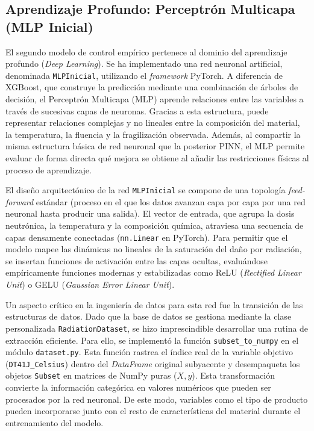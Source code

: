 \documentclass[a4paper, 12pt, twocolumn]{book}
\begin{document}
\subsection{Aprendizaje Profundo: Perceptrón Multicapa (MLP Inicial)}

El segundo modelo de control empírico pertenece al dominio del aprendizaje profundo (\textit{Deep Learning}). Se ha implementado una red neuronal artificial, denominada \texttt{MLPInicial}, utilizando el \textit{framework} PyTorch. A diferencia de XGBoost, que construye la predicción mediante una combinación de árboles de decisión, el Perceptrón Multicapa (MLP) aprende relaciones entre las variables a través de sucesivas capas de neuronas. Gracias a esta estructura, puede representar relaciones complejas y no lineales entre la composición del material, la temperatura, la fluencia y la fragilización observada. Además, al compartir la misma estructura básica de red neuronal que la posterior PINN, el MLP permite evaluar de forma directa qué mejora se obtiene al añadir las restricciones físicas al proceso de aprendizaje.

El diseño arquitectónico de la red \texttt{MLPInicial} se compone de una topología \textit{feed-forward} estándar (proceso en el que los datos avanzan capa por capa por una red neuronal hasta producir una salida). El vector de entrada, que agrupa la dosis neutrónica, la temperatura y la composición química, atraviesa una secuencia de capas densamente conectadas (\texttt{nn.Linear} en PyTorch). Para permitir que el modelo mapee las dinámicas no lineales de la saturación del daño por radiación, se insertan funciones de activación entre las capas ocultas, evaluándose empíricamente funciones modernas y estabilizadas como ReLU (\textit{Rectified Linear Unit}) o GELU (\textit{Gaussian Error Linear Unit}). 

Un aspecto crítico en la ingeniería de datos para esta red fue la transición de las estructuras de datos. Dado que la base de datos se gestiona mediante la clase personalizada \texttt{RadiationDataset}, se hizo imprescindible desarrollar una rutina de extracción eficiente. Para ello, se implementó la función \texttt{subset\_to\_numpy} en el módulo \texttt{dataset.py}. Esta función rastrea el índice real de la variable objetivo (\texttt{DT41J\_Celsius}) dentro del \textit{DataFrame} original subyacente y desempaqueta los objetos \texttt{Subset} en matrices de NumPy puras ($X, y$). Esta transformación convierte la información categórica en valores numéricos que pueden ser procesados por la red neuronal. De este modo, variables como el tipo de producto pueden incorporarse junto con el resto de características del material durante el entrenamiento del modelo.
\end{document}
